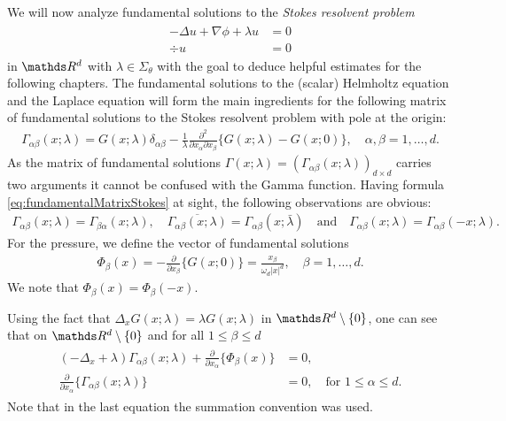 We will now analyze fundamental solutions to the \emph{Stokes resolvent problem}
\begin{align}
  \label{eq:stokesResolventProblem}
  \begin{alignedat}{1}
  -\Delta u + \nabla \phi + \lambda u &= 0 \\
  \div u &= 0
  \end{alignedat}
\end{align}
in $\R^d$ with $\lambda \in \Sigma_\theta$ with the goal to deduce helpful estimates for the following chapters.
  The fundamental solutions to the (scalar) Helmholtz equation and the Laplace equation will form the main ingredients for the following matrix of fundamental solutions to the Stokes resolvent problem with pole at the origin:
  \begin{align}
    \label{eq:fundamentalMatrixStokes}
    \Gamma_{\alpha\beta}(x;\lambda) = G(x; \lambda) \delta_{\alpha\beta} - \frac{1}{\lambda} \frac{\partial^2}{\partial x_\alpha \partial x_\beta} \Big\{ G(x; \lambda) - G(x; 0) \Big\}, \quad \alpha,\beta = 1,\dots,d.
  \end{align}
  As the matrix of fundamental solutions $\Gamma(x; \lambda) = (\Gamma_{\alpha\beta}(x; \lambda))_{d \times d}$ carries two arguments it cannot be confused with the Gamma function.
  Having formula \eqref{eq:fundamentalMatrixStokes} at sight, the following observations are obvious:
  \begin{align*}
    \Gamma_{\alpha\beta}(x; \lambda) = \Gamma_{\beta\alpha}(x; \lambda), \quad 
    \overline{\Gamma_{\alpha\beta}(x; \lambda)} = \Gamma_{\alpha\beta}(x; \bar\lambda)
    \quad\text{and}\quad
    \Gamma_{\alpha\beta}(x; \lambda) = \Gamma_{\alpha\beta}(-x; \lambda).
  \end{align*}
  For the pressure, we define the vector of fundamental solutions
  \begin{align}
    \label{eq:fundamentalVectorPressure}
      \Phi_\beta(x) = -\frac{\partial}{\partial x_\beta} \Big\{ G(x; 0) \Big\} = \frac{x_\beta}{\omega_d |x|^d}, \quad \beta= 1,\dots,d.
  \end{align}
  We note that $\Phi_\beta(x) = \Phi_\beta(-x)$.

  Using the fact that $\Delta_x G(x; \lambda) = \lambda G(x; \lambda)$ in $\R^d \setminus \{0\}$, one can see that on $\R^d \setminus \{0\}$ and for all $1 \leq \beta \leq d$
  \begin{align}
    \label{eq:solutionStokesSystem}
    \begin{alignedat}{1}
      (-\Delta_x + \lambda) \Gamma_{\alpha\beta}(x;\lambda) + \frac{\partial}{\partial x_\alpha} \Big\{ \Phi_\beta(x) \Big\} &= 0, \\
      \frac{\partial}{\partial x_\alpha} \Big\{ \Gamma_{\alpha\beta} (x; \lambda) \Big\} &= 0, \quad\text{for } 1 \leq \alpha \leq d.
    \end{alignedat}
  \end{align}
  Note that in the last equation the summation convention was used.

